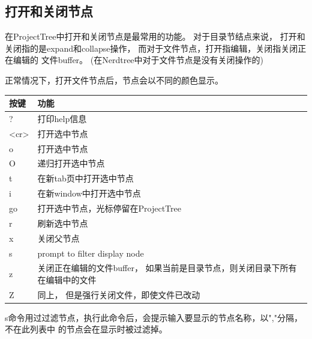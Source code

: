 \documentclass[oneside,openany]{book}
\begin{document}
  \subsection{打开和关闭节点}
  在ProjectTree中打开和关闭节点是最常用的功能。 对于目录节结点来说，
打开和关闭指的是expand和collapse操作， 而对于文件节点，打开指编辑，关闭指关闭正在编辑的
文件buffer。 (在Nerdtree中对于文件节点是没有关闭操作的)
  
  正常情况下，打开文件节点后，节点会以不同的颜色显示。
  \begin{table}[H]
  \centering
      \begin{tabular}{p{40pt}p{220pt}}
        \toprule
        按键& 功能\\
        \midrule
          ?     &打印help信息\\
          <cr>  &打开选中节点\\
          o     &打开选中节点\\
          O     &递归打开选中节点\\
          t     &在新tab页中打开选中节点\\
          i     &在新window中打开选中节点\\
          go    &打开选中节点，光标停留在ProjectTree\\
          r     &刷新选中节点\\
          x     &关闭父节点\\
          s     &prompt to filter display node\\
          z     &关闭正在编辑的文件buffer， 如果当前是目录节点，则关闭目录下所有在编辑中的文件\\
          Z     &同上， 但是强行关闭文件，即使文件已改动\\
      \bottomrule
      \end{tabular}
  \end{table}

    s命令用过过滤节点，执行此命令后，会提示输入要显示的节点名称，以","分隔，不在此列表中
的节点会在显示时被过滤掉。
\end{document}
